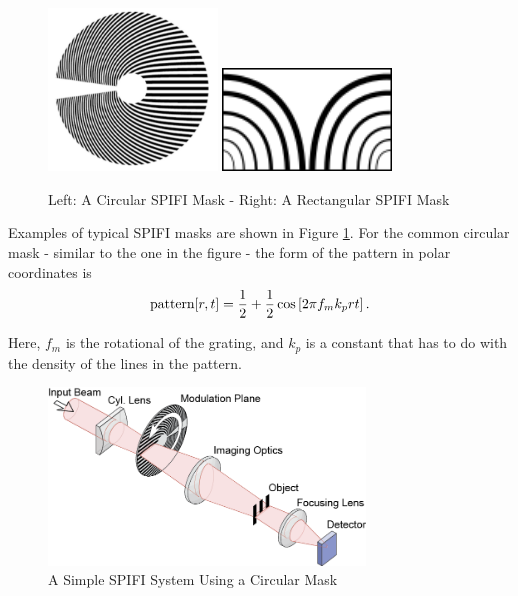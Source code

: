 \documentclass[12pt]{article}
\begin{document}
\begin{figure}[H]
\includegraphics[width=0.4\textwidth]{spinner}
\hfill
\includegraphics[width=0.4\textwidth]{rectangular_spifi_mask}
\caption{Left: A Circular SPIFI Mask -
Right: A Rectangular SPIFI Mask\label{fig:ex-grat}}
\end{figure}

Examples of typical SPIFI masks are
shown in Figure \ref{fig:ex-grat}. For the common circular mask - 
similar to the one in the figure - the form of the pattern in polar
coordinates is
\begin{equation}
\textnormal{pattern}[r,t]=\frac{1}{2}+\frac{1}{2}\cos\left[2\pi
f_mk_prt\right].
\label{eq:pattern}
\end{equation}

Here, $f_m$ is the rotational of the grating, and $k_p$ is a constant
that has to do with the density of the lines in the pattern.

\begin{figure}[H]
\centering
\includegraphics[width=0.75\textwidth]{circular_SPIFI_system}
\caption{A Simple SPIFI System Using a Circular Mask}
\label{fig:circ-sys}
\end{figure}
\end{document}
